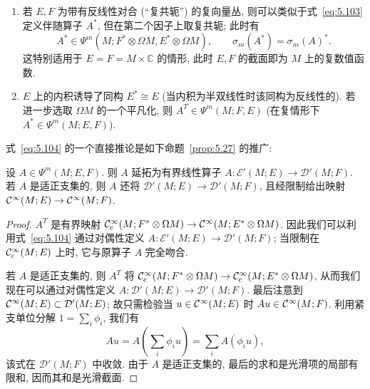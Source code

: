 \begin{remark}[具备额外结构的向量丛]\label{rem:5.44}
\begin{enumerate}
    \item 若 $E, F$ 为带有反线性对合 (``复共轭'') 的复向量丛, 则可以类似于式~\eqref{eq:5.103} 定义伴随算子 $A^*$, 但在第二个因子上取复共轭; 此时有
    \begin{equation}\label{eq:5.105}
        A^* \in \Psi^m(M; F^* \otimes \Omega M, E^* \otimes \Omega M), \qquad \sigma_m(A^*) = \sigma_m(A)^*.
    \end{equation}
    这特别适用于 $E = F = M \times \mathbb{C}$ 的情形, 此时 $E, F$ 的截面即为 $M$ 上的复数值函数.
    \item $E$ 上的内积诱导了同构 $E^* \cong E$ (当内积为半双线性时该同构为反线性的). 若进一步选取 $\Omega M$ 的一个平凡化, 则 $A^T \in \Psi^m(M; F, E)$ (在复情形下 $A^* \in \Psi^m(M; E, F)$).
\end{enumerate}
\end{remark}

式~\eqref{eq:5.104} 的一个直接推论是如下命题~\ref{prop:5.27} 的推广:

\begin{corollary}[伪微分算子在分布与光滑截面上的作用]\label{cor:5.45}
设 $A \in \Psi^m(M; E, F)$. 则 $A$ 延拓为有界线性算子 $A \colon \mathcal{E}'(M; E) \to \mathcal{D}'(M; F)$. 若 $A$ 是适正支集的, 则 $A$ 还将 $\mathcal{D}'(M; E) \to \mathcal{D}'(M; F)$, 且经限制给出映射 $\mathcal{C}^\infty(M; E) \to \mathcal{C}^\infty(M; F)$.
\end{corollary}

\begin{proof}
$A^T$ 是有界映射 $\mathcal{C}_{\mathrm{c}}^\infty(M; F^* \otimes \Omega M) \to \mathcal{C}^\infty(M; E^* \otimes \Omega M)$. 因此我们可以利用式~\eqref{eq:5.104} 通过对偶性定义 $A \colon \mathcal{E}'(M; E) \to \mathcal{D}'(M; F)$; 当限制在 $\mathcal{C}_{\mathrm{c}}^\infty(M; E)$ 上时, 它与原算子 $A$ 完全吻合.

若 $A$ 是适正支集的, 则 $A^T$ 将 $\mathcal{C}_{\mathrm{c}}^\infty(M; F^* \otimes \Omega M) \to \mathcal{C}_{\mathrm{c}}^\infty(M; E^* \otimes \Omega M)$, 从而我们现在可以通过对偶性定义 $A \colon \mathcal{D}'(M; E) \to \mathcal{D}'(M; F)$. 最后注意到 $\mathcal{C}^\infty(M; E) \subset \mathcal{D}'(M; E)$; 故只需检验当 $u \in \mathcal{C}^\infty(M; E)$ 时 $A u \in \mathcal{C}^\infty(M; F)$. 利用紧支单位分解 $1 = \sum_i \phi_i$, 我们有
\begin{equation}\label{eq:5.106}
    A u = A\left( \sum_i \phi_i u \right) = \sum_i A(\phi_i u),
\end{equation}
该式在 $\mathcal{D}'(M; F)$ 中收敛. 由于 $A$ 是适正支集的, 最后的求和是光滑项的局部有限和, 因而其和是光滑截面.
\end{proof}

